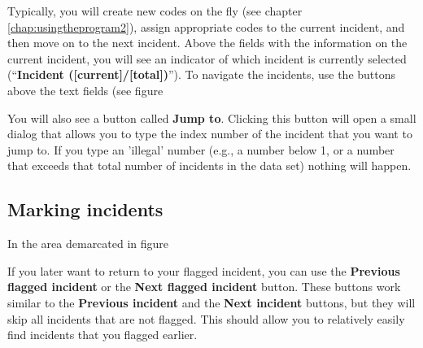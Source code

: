 \documentclass{memoir}
\begin{document}
Typically, you will create new codes on the fly (see chapter \ref{chap:usingtheprogram2}), assign appropriate codes to the current incident, and then move on to the next incident. Above the fields with the information on the current incident, you will see an indicator of which incident is currently selected (``\textbf{Incident ([current]/[total])}''). To navigate the incidents, use the buttons above the text fields (see figure %

You will also see a button called \textbf{Jump to}. Clicking this button will open a small dialog that allows you to type the index number of the incident that you want to jump to. If you type an 'illegal' number (e.g., a number below 1, or a number that exceeds that total number of incidents in the data set) nothing will happen. 

\subsection{Marking incidents}
\label{sec:markingincidents}

In the area demarcated in figure %


If you later want to return to your flagged incident, you can use the \textbf{Previous flagged incident} or the \textbf{Next flagged incident} button. These buttons work similar to the \textbf{Previous incident} and the \textbf{Next incident} buttons, but they will skip all incidents that are not flagged. This should allow you to relatively easily find incidents that you flagged earlier.
\end{document}
